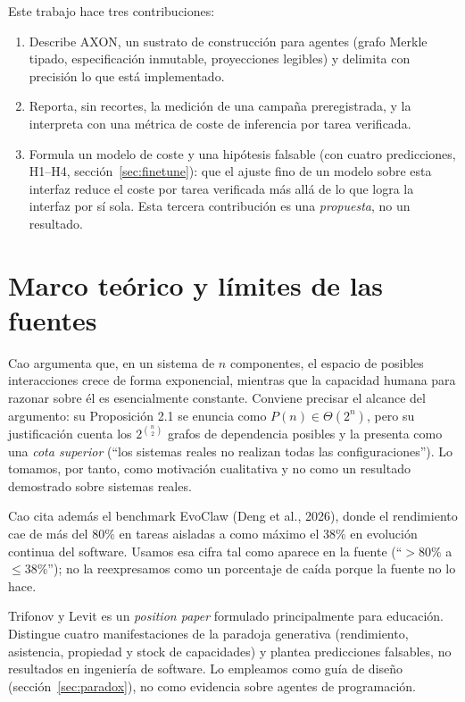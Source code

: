 \documentclass[11pt, a4paper]{article}
\newcommand{\pc}{\mbox{\%}}
\begin{document}
Este trabajo hace tres contribuciones:
\begin{enumerate}[nosep]
  \item Describe AXON, un sustrato de construcción para agentes (grafo Merkle tipado, especificación inmutable, proyecciones legibles) y delimita con precisión lo que está implementado.
  \item Reporta, sin recortes, la medición de una campaña preregistrada, y la interpreta con una métrica de coste de inferencia por tarea verificada.
  \item Formula un modelo de coste y una hipótesis falsable (con cuatro predicciones, H1--H4, sección~\ref{sec:finetune}): que el ajuste fino de un modelo sobre esta interfaz reduce el coste por tarea verificada más allá de lo que logra la interfaz por sí sola. Esta tercera contribución es una \emph{propuesta}, no un resultado.
\end{enumerate}

\section{Marco teórico y límites de las fuentes}
\label{sec:complexity}

Cao \cite{cao2026} argumenta que, en un sistema de $n$ componentes, el espacio de posibles interacciones crece de forma exponencial, mientras que la capacidad humana para razonar sobre él es esencialmente constante. Conviene precisar el alcance del argumento: su Proposición 2.1 se enuncia como $P(n)\in\Theta(2^n)$, pero su justificación cuenta los $2^{\binom{n}{2}}$ grafos de dependencia posibles y la presenta como una \emph{cota superior} (``los sistemas reales no realizan todas las configuraciones''). Lo tomamos, por tanto, como motivación cualitativa y no como un resultado demostrado sobre sistemas reales.

Cao cita además el benchmark EvoClaw (Deng et al., 2026), donde el rendimiento cae de más del $80\pc$ en tareas aisladas a como máximo el $38\pc$ en evolución continua del software. Usamos esa cifra tal como aparece en la fuente (``$>80\pc$ a $\le 38\pc$''); no la reexpresamos como un porcentaje de caída porque la fuente no lo hace.

Trifonov y Levit \cite{trifonov2026} es un \emph{position paper} formulado principalmente para educación. Distingue cuatro manifestaciones de la paradoja generativa (rendimiento, asistencia, propiedad y stock de capacidades) y plantea predicciones falsables, no resultados en ingeniería de software. Lo empleamos como guía de diseño (sección~\ref{sec:paradox}), no como evidencia sobre agentes de programación.
\end{document}
